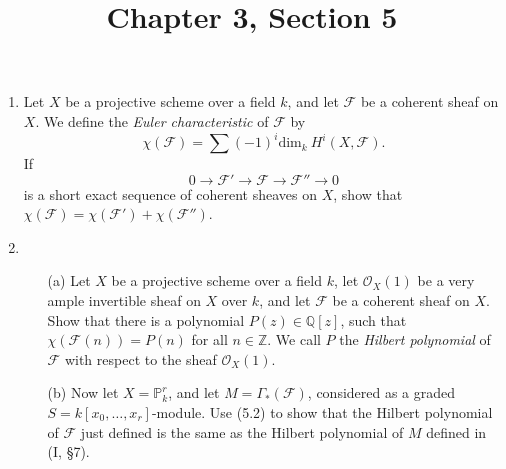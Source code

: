 \documentclass{article}
\title{Chapter 3, Section 5}
\newcommand{\fF}{\mathscr{F}}
\newcommand{\fO}{\mathscr{O}}
\newcommand{\PP}{\mathbb{P}}
\newcommand{\Q}{\mathbb{Q}}
\newcommand{\Z}{\mathbb{Z}}
\begin{document}
\maketitle
\begin{enumerate} [label=\textbf{\arabic*.}, leftmargin=0em]

\item Let $X$ be a projective scheme over a field $k$, and let $\fF$ be a coherent sheaf on $X$. We define the \textit{Euler characteristic} of $\fF$ by
\begin{equation*}
  \chi(\fF) = \sum (-1)^i \text{dim}_k~H^i(X, \fF).
\end{equation*}
If
\begin{equation*}
  0 \to \fF' \to \fF \to \fF'' \to 0
\end{equation*}
is a short exact sequence of coherent sheaves on $X$, show that $\chi(\fF) = \chi(\fF') + \chi(\fF'')$.

\item \begin{itemize}
  \item[(a)] Let $X$ be a projective scheme over a field $k$, let $\fO_X(1)$ be a very ample invertible sheaf on $X$ over $k$, and let $\fF$ be a coherent sheaf on $X$. Show that there is a polynomial $P(z) \in \Q[z]$, such that $\chi(\fF(n)) = P(n)$ for all $n \in \Z$. We call $P$ the \textit{Hilbert polynomial} of $\fF$ with respect to the sheaf $\fO_X(1)$.
  \item[(b)] Now let $X = \PP_k^r$, and let $M = \Gamma_*(\fF)$, considered as a graded $S = k[x_0, \dots, x_r]$-module. Use (5.2) to show that the Hilbert polynomial of $\fF$ just defined is the same as the Hilbert polynomial of $M$ defined in (I, \S 7).
\end{itemize}


\end{enumerate}
\end{document}
